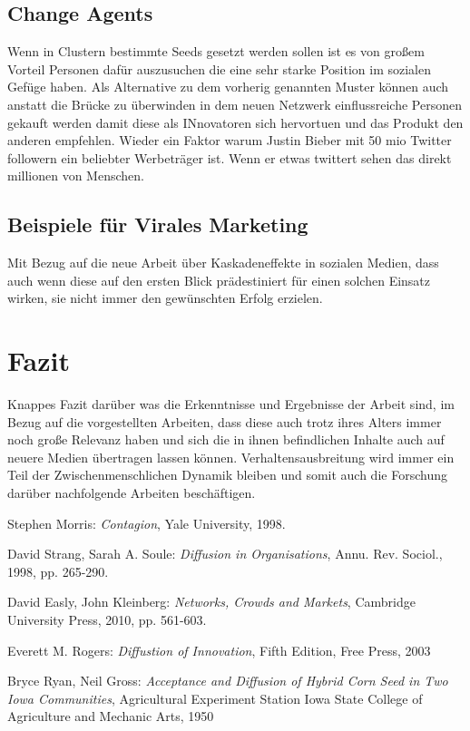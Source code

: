 \documentclass[12pt]{article}
\begin{document}
\subsection{Change Agents}
Wenn in Clustern bestimmte Seeds gesetzt werden sollen ist es von großem Vorteil Personen dafür auszusuchen die eine sehr starke Position im sozialen Gefüge haben. Als Alternative zu dem vorherig genannten Muster können auch anstatt die Brücke zu überwinden in dem neuen Netzwerk einflussreiche Personen gekauft werden damit diese als INnovatoren sich hervortuen und das Produkt den anderen empfehlen. Wieder ein Faktor warum Justin Bieber mit 50 mio Twitter followern ein beliebter Werbeträger ist. Wenn er etwas twittert sehen das direkt millionen von Menschen. 
\subsection{Beispiele für Virales Marketing}
Mit Bezug auf die neue Arbeit über Kaskadeneffekte in sozialen Medien, dass auch wenn diese auf den ersten Blick prädestiniert für einen solchen Einsatz wirken, sie nicht immer den gewünschten Erfolg erzielen. 

\section{Fazit}
Knappes Fazit darüber was die Erkenntnisse und Ergebnisse der Arbeit sind, im Bezug auf die vorgestellten Arbeiten, dass diese auch trotz ihres Alters immer noch große Relevanz haben und sich die in ihnen befindlichen Inhalte auch auf neuere Medien übertragen lassen können. Verhaltensausbreitung wird immer ein Teil der Zwischenmenschlichen Dynamik bleiben und somit auch die Forschung darüber nachfolgende Arbeiten beschäftigen.


\begin{thebibliography}{9}

  Stephen Morris:
  \emph{Contagion},
  Yale University,
  1998.
 
	David Strang, Sarah A. Soule:
	\emph{Diffusion in Organisations},
	Annu. Rev. Sociol., 1998, pp. 265-290.
	
	David Easly, John Kleinberg: 
	\emph{Networks, Crowds and Markets},
	Cambridge University Press, 2010, pp. 561-603.
	
	Everett M. Rogers: \emph{Diffustion of Innovation}, Fifth
	Edition, Free Press, 2003
	
 Bryce Ryan, Neil Gross: \emph{Acceptance and 		    Diffusion of Hybrid Corn Seed in Two Iowa Communities}, Agricultural Experiment Station Iowa State College of Agriculture and Mechanic Arts, 1950
\end{thebibliography}
\end{document}
